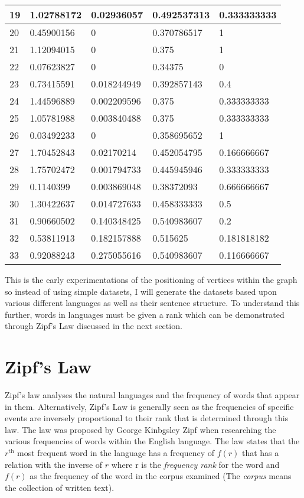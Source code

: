 \begin{table}[H]
\begin{tabular}{|l|l|l|l|l|}
        19 & 1.02788172 & 0.02936057 & 0.492537313 & 0.333333333 \\ \hline
        20 & 0.45900156 & 0 & 0.370786517 & 1 \\ \hline
        21 & 1.12094015 & 0 & 0.375 & 1 \\ \hline
        22 & 0.07623827 & 0 & 0.34375 & 0 \\ \hline
        23 & 0.73415591 & 0.018244949 & 0.392857143 & 0.4 \\ \hline
        24 & 1.44596889 & 0.002209596 & 0.375 & 0.333333333 \\ \hline
        25 & 1.05781988 & 0.003840488 & 0.375 & 0.333333333 \\ \hline
        26 & 0.03492233 & 0 & 0.358695652 & 1 \\ \hline
        27 & 1.70452843 & 0.02170214 & 0.452054795 & 0.166666667 \\ \hline
        28 & 1.75702472 & 0.001794733 & 0.445945946 & 0.333333333 \\ \hline
        29 & 0.1140399 & 0.003869048 & 0.38372093 & 0.666666667 \\ \hline
        30 & 1.30422637 & 0.014727633 & 0.458333333 & 0.5 \\ \hline
        31 & 0.90660502 & 0.140348425 & 0.540983607 & 0.2 \\ \hline
        32 & 0.53811913 & 0.182157888 & 0.515625 & 0.181818182 \\ \hline
        33 & 0.92088243 & 0.275055616 & 0.540983607 & 0.116666667 \\ \hline
    \end{tabular}
    \label{KarateTable}
\end{table}

This is the early experimentations of the positioning of vertices within the graph so instead of using simple datasets, I will generate the datasets based upon various different languages as well as their sentence structure. To understand this further, words in languages must be given a rank which can be demonstrated through Zipf's Law discussed in the next section.

\section{Zipf's Law}
Zipf's law analyses the natural languages and the frequency of words that appear in them. Alternatively, Zipf's Law\cite{hosch2009zipf} is generally seen as the frequencies of specific events are inversely proportional to their rank that is determined through this law. The law was proposed by George Kinbgsley Zipf when researching the various frequencies of words within the English language. The law states that the $r^{\text{th}}$ most frequent word in the language has a frequency of $f(r)$ that has a relation with the inverse of $r$ where r is the \emph{frequency rank} for the word and $f(r)$ as the frequency of the word in the corpus examined (The \emph{corpus} means the collection of written text).

